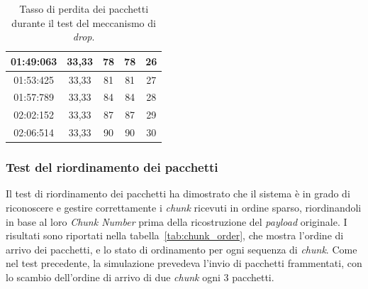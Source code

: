 \documentclass[12pt,a4paper,twoside]{book}
\begin{document}
\begin{table}[H]
{\begin{tabular}{|c|c|c|c|c|}
            01:49:063      & 33,33                          & 78                            & 78                          & 26                          \\ \hline
            01:53:425      & 33,33                          & 81                            & 81                          & 27                          \\ \hline
            01:57:789      & 33,33                          & 84                            & 84                          & 28                          \\ \hline
            02:02:152      & 33,33                          & 87                            & 87                          & 29                          \\ \hline
            02:06:514      & 33,33                          & 90                            & 90                          & 30                          \\ \hline
        \end{tabular}
    }
    \caption{Tasso di perdita dei pacchetti durante il test del meccanismo di \emph{drop}.}
    \label{tab:loss_rate}
\end{table}
\newpage
\subsubsection{Test del riordinamento dei pacchetti}
Il test di riordinamento dei pacchetti ha dimostrato che il sistema è in grado di
riconoscere e gestire correttamente i \emph{chunk} ricevuti in ordine sparso,
riordinandoli in base al loro \emph{Chunk Number} prima della ricostruzione del \emph{payload} originale.
I risultati sono riportati nella tabella~\ref{tab:chunk_order}, che mostra l'ordine
di arrivo dei pacchetti, e lo stato di ordinamento per ogni sequenza di \emph{chunk}.
Come nel test precedente, la simulazione prevedeva l'invio di pacchetti frammentati,
con lo scambio dell'ordine di arrivo di due \emph{chunk} ogni 3 pacchetti.
\end{document}
